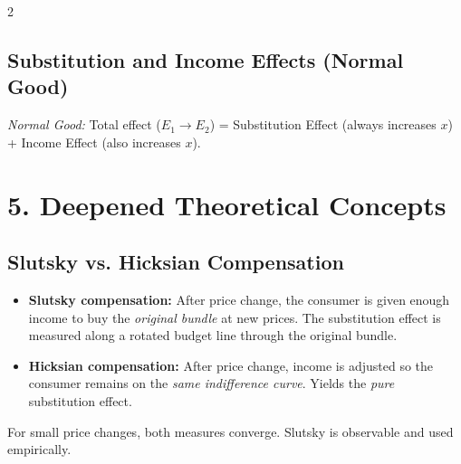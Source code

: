 \documentclass[10pt,a4paper]{article}
\begin{document}
\begin{multicols}{2}
\subsection*{Substitution and Income Effects (Normal Good)}
\begin{center}
\end{center}
\textit{Normal Good:} Total effect ($E_1 \to E_2$) = Substitution Effect (always increases $x$) + Income Effect (also increases $x$).

\section*{5. Deepened Theoretical Concepts}

\subsection*{Slutsky vs. Hicksian Compensation}
\begin{itemize}[leftmargin=*,nosep]
    \item \textbf{Slutsky compensation:} After price change, the consumer is given enough income to buy the \textit{original bundle} at new prices. The substitution effect is measured along a rotated budget line through the original bundle.
    \item \textbf{Hicksian compensation:} After price change, income is adjusted so the consumer remains on the \textit{same indifference curve}. Yields the \textit{pure} substitution effect.
\end{itemize}
For small price changes, both measures converge. Slutsky is observable and used empirically.


\end{multicols}
\end{document}
